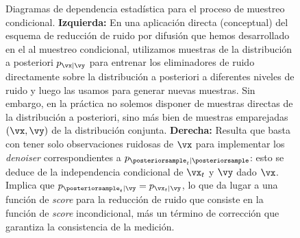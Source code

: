\documentclass[../../book-main_es.tex]{subfiles}
\begin{document}
\begin{figure}[t]
    \centering
    \begin{subfigure}{0.45\textwidth}
        \vspace{0.75cm}
        \centering
        \vspace{0.75cm}
        \caption{}
        \label{fig:left}
    \end{subfigure}
    \hfill
    \begin{subfigure}{0.45\textwidth}
        \centering
        \caption{}
        \label{fig:right}
    \end{subfigure}
    \caption{Diagramas de dependencia estadística para el proceso de
        muestreo condicional.
        \textbf{Izquierda:} En una aplicación directa (conceptual) del
        esquema de reducción de ruido por difusión
        que hemos desarrollado en el  al muestreo condicional, utilizamos
        muestras de la distribución a posteriori $p_{\vx \mid \vy}$ para entrenar
        los eliminadores de ruido directamente sobre
        la distribución a posteriori a diferentes niveles de ruido y luego las usamos para generar nuevas
        muestras. Sin embargo, en la práctica no solemos disponer de muestras directas
        de la
        distribución a posteriori, sino más bien de muestras emparejadas $(\vx, \vy)$ de la distribución conjunta.
        \textbf{Derecha:} Resulta que basta con tener solo
        observaciones ruidosas
        de $\vx$ para implementar los \textit{denoiser} correspondientes a
        $p_{\posteriorsample_t \mid
        \posteriorsample}$: esto se deduce de la independencia condicional
        de $\vx_t$ y
        $\vy$ dado $\vx$. Implica que $p_{\posteriorsample_t \mid \vy} =
        p_{\vx_t \mid
        \vy}$, lo que da lugar a una función de \textit{score} para la reducción de ruido que consiste en la
        función de \textit{score} incondicional, más un término de corrección que
    garantiza la consistencia de la medición.}
    \label{fig:posterior-sampling-cds}
\end{figure}
\end{document}
